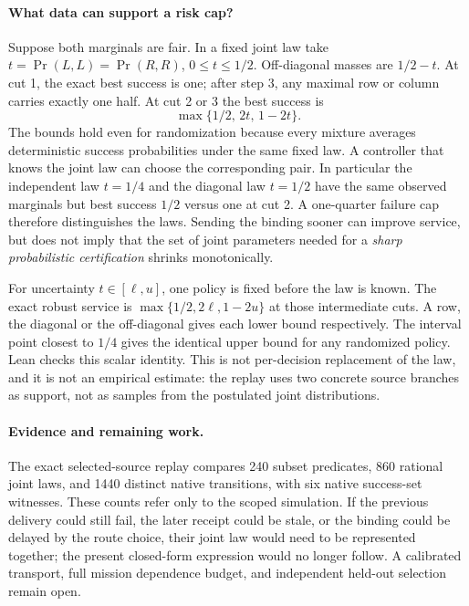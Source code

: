 \documentclass{article}
\begin{document}
\paragraph{What data can support a risk cap?}
Suppose both marginals are fair. In a fixed joint law take
\(t=\Pr(L,L)=\Pr(R,R)\), \(0\le t\le 1/2\). Off-diagonal
masses are \(1/2-t\). At cut 1, the exact best success is one;
after step 3, any maximal row or column carries exactly one
half. At cut 2 or 3 the best success is
\[
   \max\{1/2,\,2t,\,1-2t\}.
\]
The bounds hold even for randomization because every mixture
averages deterministic success probabilities under the same
fixed law. A controller that knows the joint law can choose
the corresponding pair. In particular the independent law
\(t=1/4\) and the diagonal law \(t=1/2\) have the same observed
marginals but best success \(1/2\) versus one at cut 2. A
one-quarter failure cap therefore distinguishes the laws.
Sending the binding sooner can improve service, but does
not imply that the set of joint parameters needed for a
\emph{sharp probabilistic certification} shrinks monotonically.

For uncertainty \(t\in[\ell,u]\), one policy is fixed before
the law is known. The exact robust service is
\(\max\{1/2,2\ell,1-2u\}\) at those intermediate cuts.
A row, the diagonal or the off-diagonal gives each lower
bound respectively. The interval point closest to \(1/4\)
gives the identical upper bound for any randomized policy.
Lean checks this scalar identity. This is not per-decision
replacement of the law, and it is not an empirical estimate:
the replay uses two concrete source branches as support,
not as samples from the postulated joint distributions.

\paragraph{Evidence and remaining work.}
The exact selected-source replay compares 240 subset
predicates, 860 rational joint laws, and 1440 distinct native
transitions, with six native success-set witnesses. These
counts refer only to the scoped simulation. If the previous
delivery could still fail, the later receipt could be stale,
or the binding could be delayed by the route choice, their
joint law would need to be represented together; the present
closed-form expression would no longer follow. A calibrated
transport, full mission dependence budget, and independent
held-out selection remain open.
\end{document}

